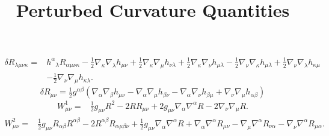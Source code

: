 \documentclass[10pt,letterpaper]{article}
\title{Perturbed Curvature Quantities}
\date{}
\newcommand{\be}{\begin{equation}} %
\newcommand{\ee}{\end{equation}} %
\begin{document}
\maketitle
\noindent
\begin{align}
\delta R_{\lambda\mu\nu\kappa}={}&h^{\alpha}{}_{\lambda} R_{\alpha \mu \nu \kappa}
 -  \tfrac{1}{2} \nabla_{\kappa}\nabla_{\lambda}h_{\mu \nu}
 + \tfrac{1}{2} \nabla_{\kappa}\nabla_{\mu}h_{\nu \lambda}
 + \tfrac{1}{2} \nabla_{\kappa}\nabla_{\nu}h_{\mu \lambda}
 -  \tfrac{1}{2} \nabla_{\nu}\nabla_{\kappa}h_{\mu \lambda}
 + \tfrac{1}{2} \nabla_{\nu}\nabla_{\lambda}h_{\kappa \mu}\nonumber\\
& -  \tfrac{1}{2} \nabla_{\nu}\nabla_{\mu}h_{\kappa \lambda}.
\end{align}
\be
	\delta R_{\mu\nu} = \tfrac{1}{2} g^{\alpha \beta} (\nabla_{\alpha}\nabla_{\beta}h_{\mu \nu} -  \nabla_{\alpha}\nabla_{\mu}h_{\beta \nu} -  \nabla_{\alpha}\nabla_{\nu}h_{\beta \mu} + \nabla_{\nu}\nabla_{\mu}h_{\alpha \beta})
\ee
\begin{align}
W^{1}_{\mu\nu}={}&\tfrac{1}{2} g_{\mu \nu} R^2
 - 2 R R_{\mu \nu}
 + 2 g_{\mu \nu} \nabla_{\alpha}\nabla^{\alpha}R
 - 2 \nabla_{\nu}\nabla_{\mu}R.
\end{align}
\begin{align}
W^2_{\mu\nu}={}&\tfrac{1}{2} g_{\mu \nu} R_{\alpha \beta} R^{\alpha \beta}
 - 2 R^{\alpha \beta} R_{\alpha \mu \beta \nu}
 + \tfrac{1}{2} g_{\mu \nu} \nabla_{\alpha}\nabla^{\alpha}R
 + \nabla_{\alpha}\nabla^{\alpha}R_{\mu \nu}
 -  \nabla_{\mu}\nabla^{\alpha}R_{\nu \alpha}
 -  \nabla_{\nu}\nabla^{\alpha}R_{\mu \alpha}.
\end{align}
\end{document}
